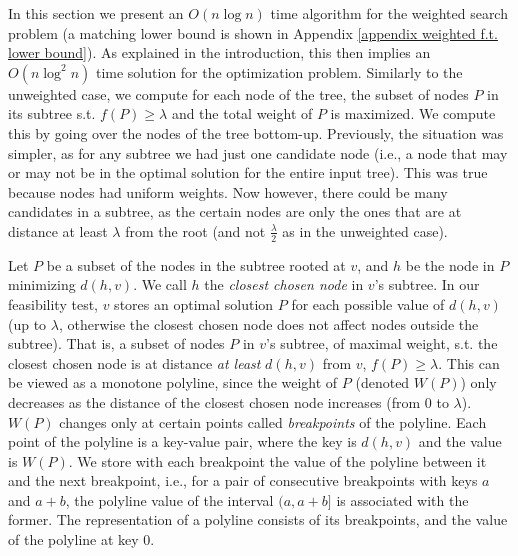 \documentclass[a4paper,UKenglish]{lipics-v2016}
\theoremstyle{plain}
\begin{document}
In this section we present an $O(n\log n)$ time algorithm for the weighted search problem (a matching lower bound is shown in Appendix \ref{appendix weighted f.t. lower bound}).
As explained in the introduction, this then implies an $O(n\log^{2}n)$ time solution for the optimization problem.
%
Similarly to the unweighted case, we compute for each node of the tree, the subset of nodes $P$ in its subtree  s.t. $f(P) \geq \lambda$ and the total  weight of  $P$ is maximized. We compute this by going over the nodes of the tree bottom-up. Previously, the situation was simpler, as for any subtree we had just one candidate node (i.e., a node that may or may not be in the optimal solution for the entire input tree). This was true because nodes had uniform weights. Now however, there could be many candidates in a subtree, as the certain nodes are only the ones that are at distance at least $\lambda$ from the root (and not $\frac{\lambda}{2}$ as in the unweighted case).

Let $P$ be a subset of the nodes in the subtree rooted at $v$, and  $h$ be the node in $P$ minimizing $d(h,v)$. We call $h$ the {\em closest chosen node} in $v$'s subtree. In our feasibility test, $v$ stores an optimal solution $P$ for each possible value of $d(h,v)$ (up to $\lambda$, otherwise the closest chosen node does not affect nodes outside the subtree). That is, a subset of nodes $P$ in $v$'s subtree, of maximal weight, s.t. the closest chosen node is at distance {\em at least} $d(h,v)$ from $v$, $f(P) \ge \lambda$. 
This can be viewed as a monotone polyline, since the weight of $P$ (denoted $W(P)$) only decreases as the distance of the closest chosen node increases (from 0 to $\lambda$). $W(P)$ changes only at certain points called {\em breakpoints} of the polyline. Each point of the polyline is a key-value pair, where the key is $d(h,v)$ and the value is $W(P)$. We store with each breakpoint the value of the polyline between it and the next breakpoint,
i.e., for a pair of consecutive breakpoints with keys $a$ and $a+b$, the polyline value of the interval $(a,a+b]$ is associated with the former.
The representation of a polyline consists of its breakpoints, and the value of the polyline at key 0.

\end{document}
